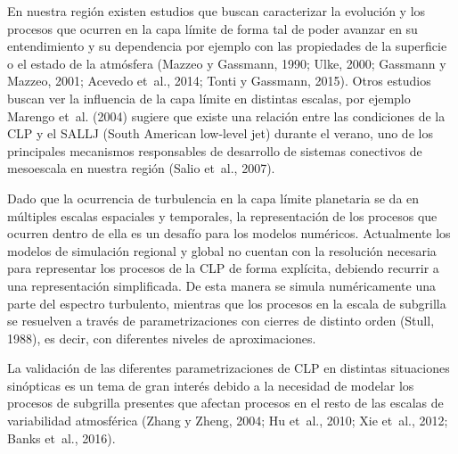 \documentclass[12pt,spanish,oneside, a4paper]{book}
\begin{document}
En nuestra región existen estudios que buscan caracterizar la evolución
y los procesos que ocurren en la capa límite de forma tal de poder
avanzar en su entendimiento y su dependencia por ejemplo con las
propiedades de la superficie o el estado de la atmósfera (Mazzeo y
Gassmann, 1990; Ulke, 2000; Gassmann y Mazzeo, 2001; Acevedo et~al.,
2014; Tonti y Gassmann, 2015). Otros estudios buscan ver la influencia
de la capa límite en distintas escalas, por ejemplo Marengo et~al.
(2004) sugiere que existe una relación entre las condiciones de la CLP y
el SALLJ (South American low-level jet) durante el verano, uno de los
principales mecanismos responsables de desarrollo de sistemas conectivos
de mesoescala en nuestra región (Salio et~al., 2007).

Dado que la ocurrencia de turbulencia en la capa límite planetaria se da
en múltiples escalas espaciales y temporales, la representación de los
procesos que ocurren dentro de ella es un desafío para los modelos
numéricos. Actualmente los modelos de simulación regional y global no
cuentan con la resolución necesaria para representar los procesos de la
CLP de forma explícita, debiendo recurrir a una representación
simplificada. De esta manera se simula numéricamente una parte del
espectro turbulento, mientras que los procesos en la escala de subgrilla
se resuelven a través de parametrizaciones con cierres de distinto orden
(Stull, 1988), es decir, con diferentes niveles de aproximaciones.

La validación de las diferentes parametrizaciones de CLP en distintas
situaciones sinópticas es un tema de gran interés debido a la necesidad
de modelar los procesos de subgrilla presentes que afectan procesos en
el resto de las escalas de variabilidad atmosférica (Zhang y Zheng,
2004; Hu et~al., 2010; Xie et~al., 2012; Banks et~al., 2016).
\end{document}
